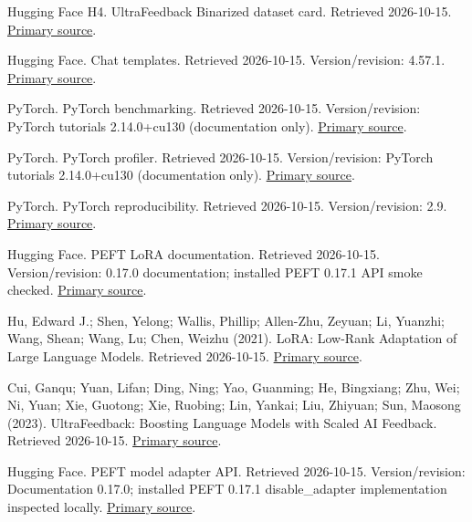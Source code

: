 \documentclass[10pt]{article}
\begin{document}
\noindent [R7] Hugging Face H4. UltraFeedback Binarized dataset card. Retrieved 2026-10-15. \href{https://huggingface.co/datasets/HuggingFaceH4/ultrafeedback_binarized/raw/main/README.md}{Primary source}.\par

\noindent [R8] Hugging Face. Chat templates. Retrieved 2026-10-15. Version/revision: 4.57.1. \href{https://huggingface.co/docs/transformers/v4.57.1/en/chat_templating}{Primary source}.\par

\noindent [R9] PyTorch. PyTorch benchmarking. Retrieved 2026-10-15. Version/revision: PyTorch tutorials 2.14.0+cu130 (documentation only). \href{https://docs.pytorch.org/tutorials/recipes/recipes/benchmark.html}{Primary source}.\par

\noindent [R10] PyTorch. PyTorch profiler. Retrieved 2026-10-15. Version/revision: PyTorch tutorials 2.14.0+cu130 (documentation only). \href{https://docs.pytorch.org/tutorials/recipes/recipes/profiler_recipe.html}{Primary source}.\par

\noindent [R11] PyTorch. PyTorch reproducibility. Retrieved 2026-10-15. Version/revision: 2.9. \href{https://docs.pytorch.org/docs/2.9/notes/randomness.html}{Primary source}.\par

\noindent [R12] Hugging Face. PEFT LoRA documentation. Retrieved 2026-10-15. Version/revision: 0.17.0 documentation; installed PEFT 0.17.1 API smoke checked. \href{https://huggingface.co/docs/peft/v0.17.0/en/developer_guides/lora}{Primary source}.\par

\noindent [R13] Hu, Edward J.; Shen, Yelong; Wallis, Phillip; Allen-Zhu, Zeyuan; Li, Yuanzhi; Wang, Shean; Wang, Lu; Chen, Weizhu (2021). LoRA: Low-Rank Adaptation of Large Language Models. Retrieved 2026-10-15. \href{https://arxiv.org/abs/2106.09685}{Primary source}.\par

\noindent [R14] Cui, Ganqu; Yuan, Lifan; Ding, Ning; Yao, Guanming; He, Bingxiang; Zhu, Wei; Ni, Yuan; Xie, Guotong; Xie, Ruobing; Lin, Yankai; Liu, Zhiyuan; Sun, Maosong (2023). UltraFeedback: Boosting Language Models with Scaled AI Feedback. Retrieved 2026-10-15. \href{https://arxiv.org/abs/2310.01377}{Primary source}.\par

\noindent [R15] Hugging Face. PEFT model adapter API. Retrieved 2026-10-15. Version/revision: Documentation 0.17.0; installed PEFT 0.17.1 disable\_adapter implementation inspected locally. \href{https://huggingface.co/docs/peft/v0.17.0/en/package_reference/peft_model}{Primary source}.\par
\end{document}
